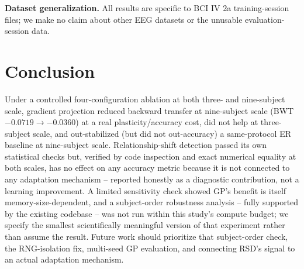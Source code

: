 \documentclass[conference]{IEEEtran}
\begin{document}
\textbf{Dataset generalization.} All results are specific to BCI IV 2a training-session files; we make no claim about other EEG datasets or the unusable evaluation-session data.

\section{Conclusion}

Under a controlled four-configuration ablation at both three- and nine-subject scale, gradient projection reduced backward transfer at nine-subject scale (BWT $-0.0719\to-0.0360$) at a real plasticity/accuracy cost, did not help at three-subject scale, and out-stabilized (but did not out-accuracy) a same-protocol ER baseline at nine-subject scale. Relationship-shift detection passed its own statistical checks but, verified by code inspection and exact numerical equality at both scales, has no effect on any accuracy metric because it is not connected to any adaptation mechanism -- reported honestly as a diagnostic contribution, not a learning improvement. A limited sensitivity check showed GP's benefit is itself memory-size-dependent, and a subject-order robustness analysis -- fully supported by the existing codebase -- was not run within this study's compute budget; we specify the smallest scientifically meaningful version of that experiment rather than assume the result. Future work should prioritize that subject-order check, the RNG-isolation fix, multi-seed GP evaluation, and connecting RSD's signal to an actual adaptation mechanism.



\end{document}
